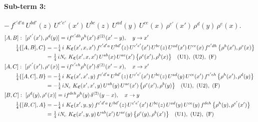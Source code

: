 \documentclass[10pt]{article}
\numberwithin{equation}{section}
\begin{document}
\paragraph{Sub-term 3:} $-\,f^{c'd'a}\,U^{bd'}(z)\,U^{c'e'}(x')\,U^{bc}(z)\,U^{ad}(y)\,U^{ce}(x)\,\rho^{e'}(x')\,\rho^{d}(y)\,\rho^{e}(x)$.
\begin{align}
&[A,B]:\ [\rho^{e'}(x'),\rho^{d}(y)]=i f^{e'dh}\rho^{h}(x')\,\delta^{(2)}(x'-y),\quad y\to x'\notag\\
&\qquad \tfrac14\{[A,B],C\}=-\tfrac14\,i\,\,K_{\mathfrak C}(x',x,x')\,f^{c'd'a}\,U^{bd'}(z)\,U^{c'e'}(x')\,U^{bc}(z)\,U^{ad}(x')\,U^{ce}(x)\,f^{e'dh}\,\big\{\rho^{h}(x'),\rho^{e}(x)\big\}\notag\\
&\qquad\phantom{\tfrac14\{[A,B],C\}}=\tfrac14\,i N_{c}\,\,K_{\mathfrak C}(x',x,x')\,U^{ab}(x)\,U^{ac}(x')\,\big\{\rho^{c}(x'),\rho^{b}(x)\big\}\quad\text{(U1)},\ \text{(U2)},\ \text{(F)}
\label{R:eq:GIII.VI-3-AB}\\
&[A,C]:\ [\rho^{e'}(x'),\rho^{e}(x)]=i f^{e'eh}\rho^{h}(x')\,\delta^{(2)}(x'-x),\quad x\to x'\notag\\
&\qquad \tfrac14\{[A,C],B\}=-\tfrac14\,i\,\,K_{\mathfrak C}(x',x',y)\,f^{c'd'a}\,U^{bd'}(z)\,U^{c'e'}(x')\,U^{bc}(z)\,U^{ad}(y)\,U^{ce}(x')\,f^{e'eh}\,\big\{\rho^{h}(x'),\rho^{d}(y)\big\}\notag\\
&\qquad\phantom{\tfrac14\{[A,C],B\}}=-\tfrac14\,i N_{c}\,\,K_{\mathfrak C}(x',x',y)\,U^{ab}(y)\,U^{ac}(x')\,\big\{\rho^{c}(x'),\rho^{b}(y)\big\}\quad\text{(U1)},\ \text{(U2)},\ \text{(F)}
\label{R:eq:GIII.VI-3-AC}\\
&[B,C]:\ [\rho^{d}(y),\rho^{e}(x)]=i f^{deh}\rho^{h}(y)\,\delta^{(2)}(y-x),\quad x\to y\notag\\
&\qquad \tfrac14\{[B,C],A\}=-\tfrac14\,i\,\,K_{\mathfrak C}(x',y,y)\,f^{c'd'a}\,U^{bd'}(z)\,U^{c'e'}(x')\,U^{bc}(z)\,U^{ad}(y)\,U^{ce}(y)\,f^{deh}\,\big\{\rho^{h}(y),\rho^{e'}(x')\big\}\notag\\
&\qquad\phantom{\tfrac14\{[B,C],A\}}=\tfrac14\,i N_{c}\,\,K_{\mathfrak C}(x',y,y)\,U^{ab}(x')\,U^{ac}(y)\,\big\{\rho^{c}(y),\rho^{b}(x')\big\}\quad\text{(U1)},\ \text{(U2)},\ \text{(F)}
\label{R:eq:GIII.VI-3-BC}
\end{align}
\end{document}

